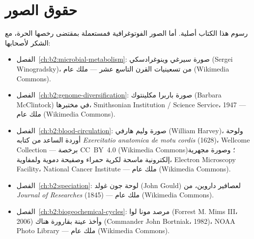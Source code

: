 %
\chapter*{حقوق الصور}

\begingroup\sloppy

رسوم هذا الكتاب أصلية. أما الصور الفوتوغرافية فمستعملة بمقتضى رخصها
الحرة، مع الشكر لأصحابها:

\begin{itemize}
  \item الفصل~\ref{ch:b2:microbial-metabolism}: صورة سيرغي
        وينوغرادسكي (Sergei Winogradsky)، من تسعينيات القرن التاسع عشر
        --- ملك عام (Wikimedia Commons).
  \item الفصل~\ref{ch:b2:genome-diversification}: صورة باربرا
        مكلينتوك (Barbara McClintock) في مختبرها، Smithsonian
        Institution / Science Service، 1947 --- ملك عام
        (Wikimedia Commons).
  \item الفصل~\ref{ch:b2:blood-circulation}: صورة وليم هارفي
        (William Harvey)، ولوحة أوردة الساعد من كتابه
        \emph{Exercitatio anatomica de motu cordis} (1628)، Wellcome
        Collection --- برخصة CC~BY~4.0 (Wikimedia Commons)؛ وصورة
        مجهرية إلكترونية ماسحة لكرية حمراء وصفيحة دموية ولمفاوية،
        Electron Microscopy Facility، National Cancer Institute ---
        ملك عام (Wikimedia Commons).
  \item الفصل~\ref{ch:b2:speciation}: لوحة جون غولد (John Gould)
        لعصافير داروين، من \emph{Journal of Researches} (1845) ---
        ملك عام (Wikimedia Commons).
  \item الفصل~\ref{ch:b2:biogeochemical-cycles}: مرصد مونا لوا
        (Forrest M. Mims III، 2006) وأخذ عينة بقارورة هناك
        (Commander John Bortniak، 1982)، NOAA Photo Library
        --- ملك عام (Wikimedia Commons).
\end{itemize}

